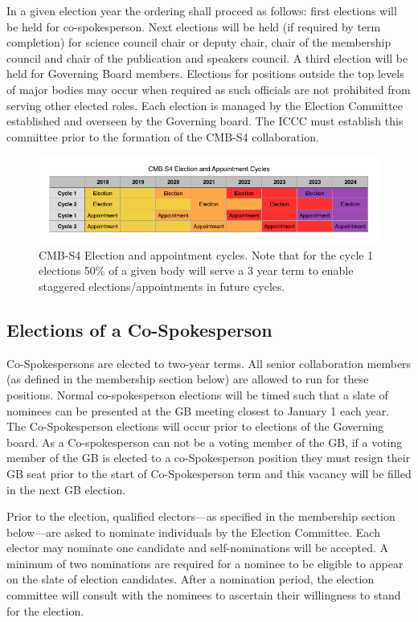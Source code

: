 \documentclass[12pt]{article}
\begin{document}
In a given election year the ordering shall proceed as follows: first elections will be held for co-spokesperson. Next elections will be held (if required by term completion) for science council chair or deputy chair, chair of the membership council and chair of the publication and speakers council. A third election will be held for Governing Board members. 
Elections for positions outside the top levels of major bodies may occur when required as such officials are not prohibited from serving other elected roles. Each election is managed by the Election Committee established and overseen by the Governing board. The ICCC must establish this committee prior to the formation of the CMB-S4 collaboration. 


\begin{figure}[h!]
\begin{center}
\includegraphics[width=6.5in]{Election_cycle.png}
\end{center}
\caption{CMB-S4 Election and appointment cycles. Note that for the cycle 1 elections 50\% of a given body will serve a 3 year term to enable staggered elections/appointments in future cycles.}
\label{fig:elect_cycle}
\end{figure}

\subsection{Elections of a Co-Spokesperson}

Co-Spokespersons are elected to two-year terms. All senior collaboration members (as defined in the membership section below) are allowed to run for these positions.  Normal co-spokesperson elections will be timed such that a slate of nominees can be presented at the GB meeting closest to January 1 each year. The Co-Spokesperson elections will occur prior to elections of the Governing board. As a Co-spokesperson can not be a voting member of the GB, if a voting member of the GB is elected to a co-Spokesperson position they must resign their GB seat prior to the start of Co-Spokesperson term and this vacancy will be filled in the next GB election. 

Prior to the election, qualified electors---as specified in the membership section below---are asked to nominate individuals by the Election Committee. Each elector may nominate one candidate and self-nominations will be accepted. A minimum of two nominations are required for a nominee to be eligible to appear on the slate of election candidates. After a nomination period, the election committee  will consult with the nominees to ascertain their willingness to stand for the election.
\end{document}
